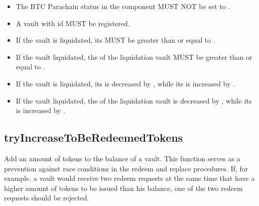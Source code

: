 \documentclass[a4paper,10pt,english]{sphinxmanual}
\begin{document}
\begin{itemize}
\item {} 
The BTC Parachain status in the {\hyperref[\detokenize{spec/security:security}]{}} component MUST NOT be set to .

\item {} 
A vault with id  MUST be registered.

\item {} 
If the vault is  liquidated, its  MUST be greater than or equal to .

\item {} 
If the vault  liquidated, the  of the liquidation vault MUST be greater than or equal to .

\end{itemize}

\begin{itemize}
\item {} 
If the vault is  liquidated, its  is decreased by , while its  is increased by .

\item {} 
If the vault  liquidated, the  of the liquidation vault is decreased by , while its  is increased by .

\end{itemize}


\subsection{tryIncreaseToBeRedeemedTokens}
\label{\detokenize{spec/vault-registry:tryincreasetoberedeemedtokens}}\label{\detokenize{spec/vault-registry:id19}}
Add an amount of tokens to the  balance of a vault. This function serves as a prevention against race conditions in the redeem and replace procedures.
If, for example, a vault would receive two redeem requests at the same time that have a higher amount of tokens to be issued than his  balance, one of the two redeem requests should be rejected.
\end{document}
